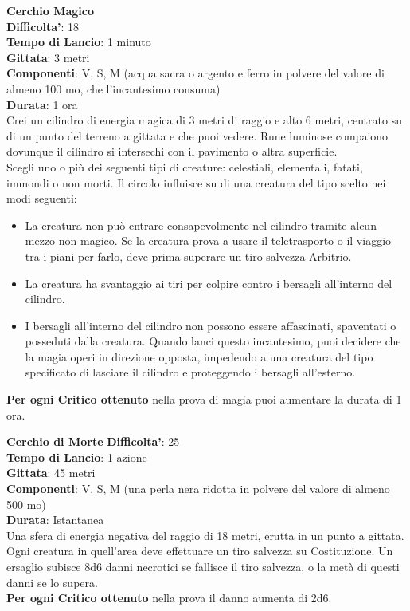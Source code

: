 \begin{multicols}{2}
\medskip\textbf{Cerchio Magico}\\
\textbf{Difficolta'}: 18\\
\textbf{Tempo di Lancio}: 1 minuto\\
\textbf{Gittata}: 3 metri\\
\textbf{Componenti}: V, S, M (acqua sacra o argento e ferro in polvere del valore di almeno 100 mo, che l’incantesimo consuma)\\
\textbf{Durata}: 1 ora\\
Crei un cilindro di energia magica di 3 metri di raggio e alto 6 metri, centrato su di un punto del terreno a gittata e che puoi vedere. Rune luminose compaiono dovunque il cilindro si intersechi con il pavimento o altra superficie.\\
Scegli uno o più dei seguenti tipi di creature: celestiali, elementali, fatati, immondi o non morti. Il circolo influisce su di una creatura del tipo scelto nei modi seguenti:\\
\begin{itemize}
	\item 
La creatura non può entrare consapevolmente nel cilindro tramite alcun mezzo non magico. Se la creatura prova a usare il teletrasporto o il viaggio tra i piani per farlo, deve prima superare un tiro salvezza Arbitrio.
	\item 
La creatura ha svantaggio ai tiri per colpire contro i bersagli all’interno del cilindro.
	\item 
I bersagli all’interno del cilindro non possono essere affascinati, spaventati o posseduti dalla creatura. Quando lanci questo incantesimo, puoi decidere che la magia operi in direzione opposta, impedendo a una creatura del tipo specificato di lasciare il cilindro e proteggendo i bersagli all’esterno.
\end{itemize}
\textbf{Per ogni Critico ottenuto} nella prova di magia puoi aumentare la durata di 1 ora.

\medskip\textbf{Cerchio di Morte}
\textbf{Difficolta'}: 25\\
\textbf{Tempo di Lancio}: 1 azione\\
\textbf{Gittata}: 45 metri\\
\textbf{Componenti}: V, S, M (una perla nera ridotta in polvere del valore di almeno 500 mo)\\
\textbf{Durata}: Istantanea\\
Una sfera di energia negativa del raggio di 18 metri, erutta in un punto a gittata. Ogni creatura in quell’area deve effettuare un tiro salvezza su Costituzione. Un  ersaglio subisce 8d6 danni necrotici se fallisce il tiro salvezza, o la metà di questi danni se lo supera. \\
\textbf{Per ogni Critico ottenuto} nella prova il danno aumenta di 2d6.


\end{multicols}
